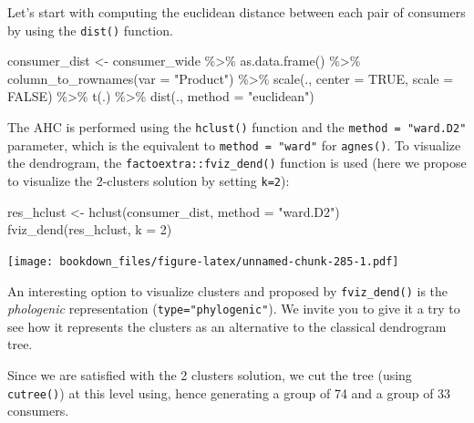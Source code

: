 \documentclass[
]{krantz}
\makeatletter
\newenvironment{Shaded}{\begin{snugshade}}{\end{snugshade}}
\newcommand{\AttributeTok}[1]{\textcolor[rgb]{0.61,0.61,0.61}{#1}}
\newcommand{\ConstantTok}[1]{\textcolor[rgb]{0,0,0}{#1}}
\newcommand{\DecValTok}[1]{\textcolor[rgb]{0.06,0.06,0.06}{#1}}
\newcommand{\FunctionTok}[1]{\textcolor[rgb]{0,0,0}{#1}}
\newcommand{\NormalTok}[1]{#1}
\newcommand{\OtherTok}[1]{\textcolor[rgb]{0.37,0.37,0.37}{#1}}
\newcommand{\SpecialCharTok}[1]{\textcolor[rgb]{0,0,0}{#1}}
\newcommand{\StringTok}[1]{\textcolor[rgb]{0.5,0.5,0.5}{#1}}
\renewenvironment{quote}{\begin{VF}}{\end{VF}}
\newenvironment{kframe}{%
\medskip{}
\setlength{\fboxsep}{.8em}
 \def\at@end@of@kframe{}%
 \ifinner\ifhmode%
  \def\at@end@of@kframe{\end{minipage}}%
  \begin{minipage}{\columnwidth}%
 \fi\fi%
 \def\FrameCommand##1{\hskip\@totalleftmargin \hskip-\fboxsep
 \colorbox{shadecolor}{##1}\hskip-\fboxsep
     \hskip-\linewidth \hskip-\@totalleftmargin \hskip\columnwidth}%
 \MakeFramed {\advance\hsize-\width
   \@totalleftmargin\z@ \linewidth\hsize
   \@setminipage}}%
 {\par\unskip\endMakeFramed%
 \at@end@of@kframe}
\renewenvironment{Shaded}{\begin{kframe}}{\end{kframe}}
\makeatother
\begin{document}
Let's start with computing the euclidean distance between each pair of consumers by using the \texttt{dist()} function.

\begin{Shaded}
\begin{Highlighting}[]
\NormalTok{consumer\_dist }\OtherTok{\textless{}{-}}\NormalTok{ consumer\_wide }\SpecialCharTok{\%\textgreater{}\%}
  \FunctionTok{as.data.frame}\NormalTok{() }\SpecialCharTok{\%\textgreater{}\%}
  \FunctionTok{column\_to\_rownames}\NormalTok{(}\AttributeTok{var =} \StringTok{"Product"}\NormalTok{) }\SpecialCharTok{\%\textgreater{}\%}
  \FunctionTok{scale}\NormalTok{(., }\AttributeTok{center =} \ConstantTok{TRUE}\NormalTok{, }\AttributeTok{scale =} \ConstantTok{FALSE}\NormalTok{) }\SpecialCharTok{\%\textgreater{}\%}
  \FunctionTok{t}\NormalTok{(.) }\SpecialCharTok{\%\textgreater{}\%}
  \FunctionTok{dist}\NormalTok{(., }\AttributeTok{method =} \StringTok{"euclidean"}\NormalTok{)}
\end{Highlighting}
\end{Shaded}

The AHC is performed using the \texttt{hclust()} function and the \texttt{method\ =\ "ward.D2"} parameter, which is the equivalent to \texttt{method\ =\ "ward"} for \texttt{agnes()}. To visualize the dendrogram, the \texttt{factoextra::fviz\_dend()} function is used (here we propose to visualize the 2-clusters solution by setting \texttt{k=2}):

\begin{Shaded}
\begin{Highlighting}[]
\NormalTok{res\_hclust }\OtherTok{\textless{}{-}} \FunctionTok{hclust}\NormalTok{(consumer\_dist, }\AttributeTok{method =} \StringTok{"ward.D2"}\NormalTok{)}
\FunctionTok{fviz\_dend}\NormalTok{(res\_hclust, }\AttributeTok{k =} \DecValTok{2}\NormalTok{)}
\end{Highlighting}
\end{Shaded}

\texttt{[image: bookdown\_files/figure-latex/unnamed-chunk-285-1.pdf]}

\begin{quote}
An interesting option to visualize clusters and proposed by \texttt{fviz\_dend()} is the \emph{phologenic} representation (\texttt{type="phylogenic"}). We invite you to give it a try to see how it represents the clusters as an alternative to the classical dendrogram tree.
\end{quote}

Since we are satisfied with the 2 clusters solution, we cut the tree (using \texttt{cutree()}) at this level using, hence generating a group of 74 and a group of 33 consumers.
\end{document}
